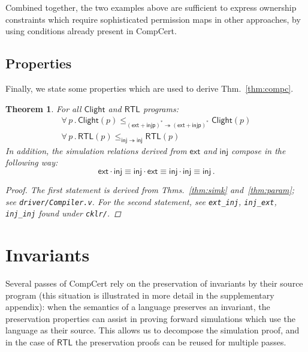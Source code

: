 \documentclass[draft,11pt]{report}
\newtheorem{theorem}{Theorem}[chapter]
\theoremstyle{definition}
\newcommand{\kw}[1]{\ensuremath{ \mathsf{#1} }}
\begin{document}
Combined together,
the two examples above are sufficient to express
ownership constraints which require
sophisticated permission maps in other approaches,
by using conditions already present in CompCert.


\subsection{Properties} \label{sec:cklr-props} %

Finally,
we state some properties which are used
to derive Thm.~\ref{thm:compc}.

\begin{theorem} \label{thm:cklr-props}
For all $\kw{Clight}$ and $\kw{RTL}$ programs:
\begin{gather*}
\forall \, p \,.\,
  \kw{Clight}(p)
  \le_{(\kw{ext} + \kw{injp})^* \twoheadrightarrow (\kw{ext} + \kw{injp})^*}
  \kw{Clight}(p) \\
\forall \, p \,.\,
  \kw{RTL}(p)
  \le_{\kw{inj} \twoheadrightarrow \kw{inj}}
  \kw{RTL}(p)
\end{gather*}
In addition,
the simulation relations derived from $\kw{ext}$ and $\kw{inj}$
compose in the following way:
\[
  \kw{ext} \cdot \kw{inj} \equiv
  \kw{inj} \cdot \kw{ext} \equiv
  \kw{inj} \cdot \kw{inj} \equiv
  \kw{inj} \,.
\]
\begin{proof}
The first statement is derived from
Thms.~\ref{thm:simk} and~\ref{thm:param};
see \texttt{driver/Compiler.v}.
For the second statement, see
\texttt{ext\_inj}, \texttt{inj\_ext}, \texttt{inj\_inj}
found under \texttt{cklr/}.
\end{proof}
\end{theorem}



\section{Invariants} \label{sec:inv} %


Several passes of CompCert
rely on the preservation of invariants
by their source program
(this situation is illustrated in more detail in the supplementary
appendix):
when the semantics of a language preserves an invariant,
the preservation properties can assist
in proving forward simulations
which use the language as their source.
This allows us to decompose the simulation proof,
and in the case of $\kw{RTL}$
the preservation proofs can be reused for multiple passes.
\end{document}
